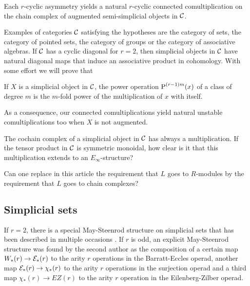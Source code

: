 \begin{theorem}\label{thm:main}
    Each $r$-cyclic asymmetry yields a natural $r$-cyclic connected comultiplication on the chain complex of augmented semi-simplicial objects in $\mathcal{C}$.  
\end{theorem}
Examples of categories $\mathcal{C}$ satisfying the hypotheses are the category of sets, the category of pointed sets, the category of groups or the category of associative algebras. If $\mathcal{C}$ has a cyclic diagonal for $r= 2$, then simplicial objects in $\mathcal{C}$ have natural diagonal maps that induce an associative product in cohomology. With some effort we will prove that
\begin{theorem}
    If $X$ is a simplicial object in $\mathcal{C}$, the power operation $\operatorname{P}^{(r-1)m}(x)$ of a class of degree $m$ is the $m$-fold power of the multiplication of $x$ with itself.
\end{theorem}
As a consequence, our connected comultiplications yield natural unstable comultiplications too when $X$ is not augmented.

\begin{question}
    The cochain complex of a simplicial object in $\mathcal{C}$ has always a multiplication. If the tensor product in $\mathcal{C}$ is symmetric monoidal, how clear is it that this multiplication extends to an $E_{\infty}$-structure? 
\end{question}
\begin{question}
    Can one replace in this article the requirement that $L$ goes to $R$-modules by the requirement that $L$ goes to chain complexes?
\end{question}

\subsection*{Simplicial sets} If $r=2$, there is a special May-Steenrod structure on simplicial sets that has been described in multiple occasions \cite{steenrod1947products,gonzalez-diaz1999steenrod,medina2021fast_sq}. If $r$ is odd, an explicit May-Steenrod structure was found by the second author \cite{medina2021may_st} as the composition of a certain map $W_*(r)\to \mathcal{E}_*(r)$ to the arity $r$ operations in the Barratt-Eccles operad, another map $\mathcal{E}_*(r)\to \chi_*(r)$ to the arity $r$ operations in the surjection operad \cite{berger2004combinatorial} and a third map $\chi_*(r)\to EZ(r)$ to the arity $r$ operation in the Eilenberg-Zilber operad\cite{mcclure2003multivariable}. 

